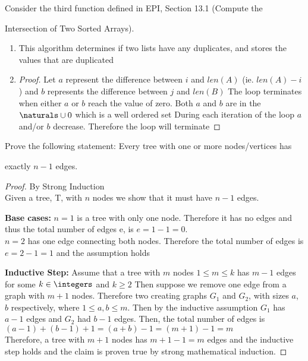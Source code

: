 \documentclass{article}
\author{Elliott Pryor}
\date{due: 6 September 2019}
\begin{document}
\nextprob

Consider the third function defined in EPI, Section 13.1 (Compute the

Intersection of Two Sorted Arrays).

\begin{enumerate}

    \item This algorithm determines if two lists have any duplicates, and stores the values that are duplicated
    \item 

\begin{proof}

Let $a$ represent the difference between $i$ and $len(A)$ (ie. $len(A) - i$) and $b$ represents the difference between $j$ and $len(B)$
 The loop terminates when either $a$ or $b$ reach the value of zero. Both $a$ and $b$ are in the $\naturals \cup 0$ which is a well ordered set
 During each iteration of the loop $a$ and/or $b$ decrease. Therefore the loop will terminate
\end{proof}    

    

\end{enumerate}



\nextprob

Prove the following statement: Every tree with one or more nodes/vertices has

exactly $n-1$ edges.



\begin{proof} By Strong Induction\\

Given a tree, T, with $n$ nodes we show that it must have $n-1$ edges. 



\textbf{Base cases: } $n = 1$ is a tree with only one node. Therefore it has no edges and thus the total number of edges
 e, is $e = 1 - 1 = 0$.\\

$n = 2$ has one edge connecting both nodes. Therefore the total number of edges is $e = 2 - 1 = 1$ and the assumption holds


\textbf{Inductive Step: } Assume that a tree with $m$ nodes $1 \leq m \leq k$ has $m - 1$ edges for some $k \in \integers$ and $k \geq 2$
 Then suppose we remove one edge from a graph with $m + 1$ nodes. Therefore two creating graphs
 $G_1$ and $G_2$, with sizes $a$, $b$ respectively, where $1 \leq a,b \leq m$. Then by the inductive assumption
 $G_1$ has $a-1$ edges and $G_2$ had $b-1$ edges. Then, the total number of edges is\\

$(a-1) + (b-1) + 1 = (a + b) - 1 = (m + 1) - 1 = m$\\

Therefore, a tree with $m + 1$ nodes has $m + 1 - 1 = m$ edges and the inductive step holds
 and the claim is proven true by strong mathematical induction. 

\end{proof}
\end{document}
